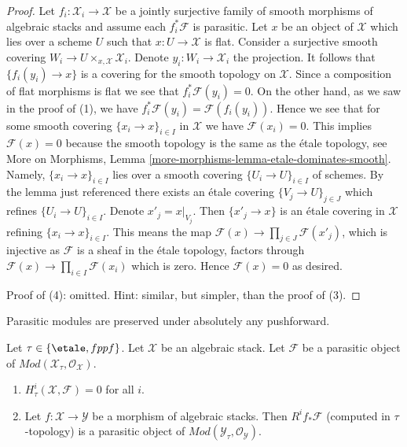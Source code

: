 \begin{proof}
\medskip\noindent
Let $f_i : \mathcal{X}_i \to \mathcal{X}$ be a jointly surjective family of
smooth morphisms of algebraic stacks and assume each $f_i^*\mathcal{F}$
is parasitic. Let $x$ be an object of $\mathcal{X}$ which lies over a
scheme $U$ such that $x : U \to \mathcal{X}$ is flat. Consider a surjective
smooth covering $W_i \to U \times_{x, \mathcal{X}} \mathcal{X}_i$.
Denote $y_i : W_i \to \mathcal{X}_i$ the projection. It follows
that $\{f_i(y_i) \to x\}$ is a covering for the smooth topology
on $\mathcal{X}$. Since a composition of flat morphisms is flat we see that
$f_i^*\mathcal{F}(y_i) = 0$. On the other hand, as we saw in the proof
of (1), we have $f_i^*\mathcal{F}(y_i) = \mathcal{F}(f_i(y_i))$.
Hence we see that for some smooth covering $\{x_i \to x\}_{i \in I}$
in $\mathcal{X}$ we have $\mathcal{F}(x_i) = 0$. This implies
$\mathcal{F}(x) = 0$ because the smooth topology is the same
as the \'etale topology, see
More on Morphisms, Lemma \ref{more-morphisms-lemma-etale-dominates-smooth}.
Namely, $\{x_i \to x\}_{i \in I}$ lies over a smooth covering
$\{U_i \to U\}_{i \in I}$ of schemes. By the lemma just referenced
there exists an \'etale covering $\{V_j \to U\}_{j \in J}$ which
refines $\{U_i \to U\}_{i \in I}$. Denote $x'_j = x|_{V_j}$.
Then $\{x'_j \to x\}$ is an \'etale covering in $\mathcal{X}$
refining $\{x_i \to x\}_{i \in I}$. This means the map
$\mathcal{F}(x) \to \prod_{j \in J} \mathcal{F}(x'_j)$, which is
injective as $\mathcal{F}$ is a sheaf in the \'etale topology,
factors through $\mathcal{F}(x) \to \prod_{i \in I} \mathcal{F}(x_i)$
which is zero. Hence $\mathcal{F}(x) = 0$ as desired.

\medskip\noindent
Proof of (4): omitted. Hint: similar, but simpler, than the proof of (3).
\end{proof}

\noindent
Parasitic modules are preserved under absolutely any pushforward.

\begin{lemma}
\label{lemma-pushforward-parasitic}
Let $\tau \in \{\etale, fppf\}$.
Let $\mathcal{X}$ be an algebraic stack.
Let $\mathcal{F}$ be a parasitic object of
$\textit{Mod}(\mathcal{X}_\tau, \mathcal{O}_\mathcal{X})$.
\begin{enumerate}
\item $H^i_\tau(\mathcal{X}, \mathcal{F}) = 0$ for all $i$.
\item Let $f : \mathcal{X} \to \mathcal{Y}$ be a morphism of algebraic stacks.
Then $R^if_*\mathcal{F}$ (computed in $\tau$-topology) is a
parasitic object of $\textit{Mod}(\mathcal{Y}_\tau, \mathcal{O}_\mathcal{Y})$.
\end{enumerate}
\end{lemma}

